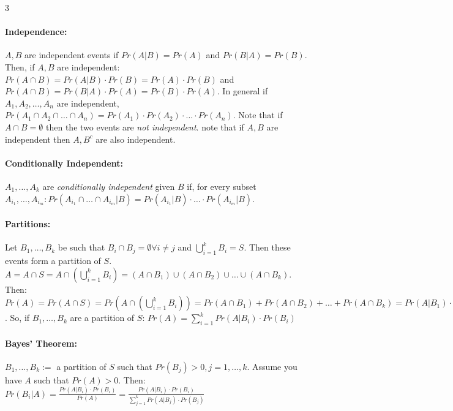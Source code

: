 \documentclass[landscape,10pt]{article}
\begin{document}
\begin{multicols}{3}
        \paragraph*{Independence:}
            $A, B$ are independent events if $Pr(A|B) = Pr(A)$ and $Pr(B|A) = Pr(B)$. Then, if $A, B$ are independent: $Pr(A \cap B) = Pr(A|B) \cdot Pr(B) = Pr(A) \cdot Pr(B)$ and $Pr(A \cap B) = Pr(B | A) \cdot Pr(A) = Pr(B) \cdot Pr(A)$. In general if $A_1, A_2, \ldots, A_n$ are independent, $Pr(A_1 \cap A_2 \cap \ldots \cap A_n) = Pr(A_1) \cdot Pr(A_2) \cdot \ldots \cdot Pr(A_n)$. Note that if $A \cap B = \emptyset$ then the two events are \textit{not independent}. note that if $A, B$ are independent then $A, B^c$ are also independent.
        
        \paragraph*{Conditionally Independent: } 
            $A_1, \ldots, A_k$ are \textit{conditionally independent} given $B$ if, for every subset $A_{i_1}, \ldots, A_{i_m}: Pr(A_{i_1} \cap \ldots \cap A_{i_m} | B) = Pr(A_{i_1} | B) \cdot \ldots \cdot Pr(A_{i_m} | B)$.
        
        \paragraph*{Partitions: }
            Let $B_1, \ldots, B_k$ be such that $B_i \cap B_j = \emptyset \forall i \neq j$ and $\bigcup\limits_{i = 1}^{k} B_i = S$. Then these events form a partition of $S$. \\
            $A = A \cap S = A \cap \left(\bigcup\limits_{i = 1}^{k} B_i\right) = (A \cap B_1) \cup (A \cap B_2) \cup \ldots \cup (A \cap B_k)$. Then: $Pr(A) = Pr(A \cap S) = Pr(A \cap \left(\bigcup\limits_{i = 1}^{k} B_i \right)) = Pr(A \cap B_1) + Pr(A \cap B_2) + \ldots + Pr(A \cap B_k) = Pr(A|B_1) \cdot Pr(B_1) + Pr(A|B_2)\cdot Pr(B_2) + \ldots + Pr(A|B_k) \cdot Pr(B_k) = \sum\limits_{i=1}^{k} Pr(A|B_i)\cdot Pr(B_i)$. So, if $B_1, \ldots, B_k$ are a partition of $S$: $Pr(A) = \sum\limits_{i=1}^{k}Pr(A|B_i)\cdot Pr(B_i)$
        
        \paragraph*{Bayes' Theorem:}
            $B_1, \ldots, B_k :=$ a partition of $S$ such that $Pr(B_j) > 0, j = 1, \ldots, k$. Assume you have $A$ such that $Pr(A) > 0$. Then: $Pr(B_i|A) = \frac{Pr(A|B_i) \cdot Pr(B_i)}{Pr(A)} = \frac{Pr(A|B_i) \cdot Pr(B_i)}{\sum\limits_{j=1}^{k}Pr(A|B_j) \cdot Pr(B_j)}$
        

\end{multicols}
\end{document}
